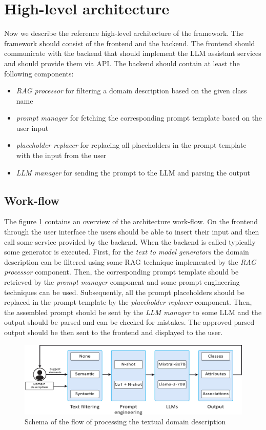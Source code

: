 \section{High-level architecture}

Now we describe the reference high-level architecture of the framework. The framework should consist of the frontend and the backend. The frontend should communicate with the backend that should implement the LLM assistant services and should provide them via API. The backend should contain at least the following components:

\begin{itemize}
\item \emph{RAG processor} for filtering a domain description based on the given class name
\item \emph{prompt manager} for fetching the corresponding prompt template based on the user input
\item \emph{placeholder replacer} for replacing all placeholders in the prompt template with the input from the user
\item \emph{LLM manager} for sending the prompt to the LLM and parsing the output
\end{itemize}


\subsection{Work-flow}

The figure \ref{fig:work-flow} contains an overview of the architecture work-flow. On the frontend through the user interface the users should be able to insert their input and then call some service provided by the backend. When the backend is called typically some generator is executed. First, for the \emph{text to model generators} the domain description can be filtered using some RAG technique implemented by the \emph{RAG processor} component. Then, the corresponding prompt template should be retrieved by the \emph{prompt manager} component and some prompt engineering techniques can be used. Subsequently, all the prompt placeholders should be replaced in the prompt template by the \emph{placeholder replacer} component. Then, the assembled prompt should be sent by the \emph{LLM manager} to some LLM and the output should be parsed and can be checked for mistakes. The approved parsed output should be then sent to the frontend and displayed to the user.

\begin{figure}[!h]
    \centering
    \includegraphics[scale=0.23]{img/work-flow.jpg}
    \caption{\centering Schema of the flow of processing the textual domain description}
    \label{fig:work-flow}
\end{figure}

